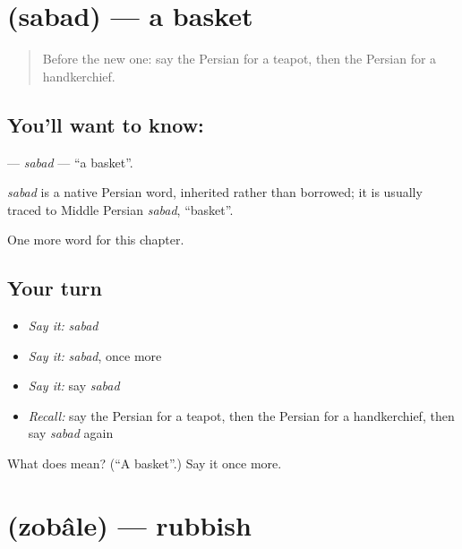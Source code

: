 \section[\texorpdfstring{\fa{سبد} (sabad)}{سبد (sabad)}]{ (sabad) — a basket}

\label{lesson:FA-C239-sabad}



\begin{quote}
Before the new one: say the Persian for a teapot, then the Persian for a handkerchief.
\end{quote}

\subsection*{You'll want to know: }
\textbf{} — \emph{sabad} — \textquotedblleft{}a basket\textquotedblright{}.

\begin{cousinweb}
\emph{sabad} is a native Persian word, inherited rather than borrowed; it is usually traced to Middle Persian \emph{sabad}, \textquotedblleft{}basket\textquotedblright{}.
\end{cousinweb}

\begin{grammarlens}[title={What you've built}]
One more word for this chapter.
\end{grammarlens}

\subsection*{Your turn}
\begin{itemize}
\raggedright
  \item \emph{Say it:} \emph{sabad}
  \item \emph{Say it:} \emph{sabad}, once more
  \item \emph{Say it:} say \emph{sabad}
  \item \emph{Recall:} say the Persian for a teapot, then the Persian for a handkerchief, then say \emph{sabad} again
\end{itemize}

\begin{tcolorbox}[breakable,colback=teal!4,colframe=teal!35!black,title={Before you move on}]
What does  mean? (\textquotedblleft{}A basket\textquotedblright{}.) Say it once more.
\end{tcolorbox}
\section[\texorpdfstring{\fa{زباله} (zobâle)}{زباله (zobâle)}]{ (zobâle) — rubbish}

